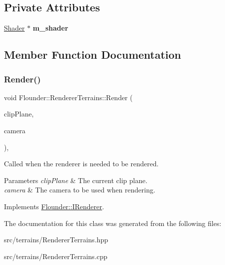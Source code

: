 \subsection*{Private Attributes}
\begin{DoxyCompactItemize}
\item 
\mbox{\label{class_flounder_1_1_renderer_terrains_aee57832b6ec4d9bde59ef75031f43584}} 
\hyperlink{class_flounder_1_1_shader}{Shader} $\ast$ {\bfseries m\+\_\+shader}
\end{DoxyCompactItemize}


\subsection{Member Function Documentation}
\mbox{\label{class_flounder_1_1_renderer_terrains_a80430446c6982b2598de3f437d7097e3}} 
\subsubsection{\texorpdfstring{Render()}{Render()}}
{\footnotesize\ttfamily void Flounder\+::\+Renderer\+Terrains\+::\+Render (\begin{DoxyParamCaption}\item[{const \hyperlink{class_flounder_1_1_vector4}{Vector4} \&}]{clip\+Plane,  }\item[{const \hyperlink{class_flounder_1_1_i_camera}{I\+Camera} \&}]{camera }\end{DoxyParamCaption})\hspace{0.3cm}{\ttfamily [override]}, {\ttfamily [virtual]}}



Called when the renderer is needed to be rendered. 


\begin{DoxyParams}{Parameters}
{\em clip\+Plane} & The current clip plane. \\
\hline
{\em camera} & The camera to be used when rendering. \\
\hline
\end{DoxyParams}


Implements \hyperlink{class_flounder_1_1_i_renderer_a4e86d6621f6f63442e1c07655afd9daa}{Flounder\+::\+I\+Renderer}.



The documentation for this class was generated from the following files\+:\begin{DoxyCompactItemize}
\item 
src/terrains/Renderer\+Terrains.\+hpp\item 
src/terrains/Renderer\+Terrains.\+cpp\end{DoxyCompactItemize}
